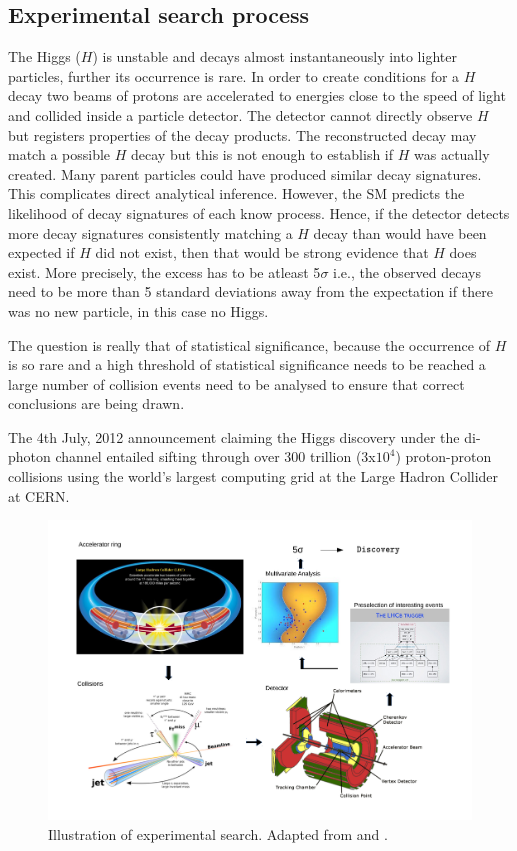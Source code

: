 \subsection{Experimental search process}
\label{esp}

The Higgs ($H$) is unstable and decays almost instantaneously into lighter particles, further its occurrence is rare. In order to create conditions for a $H$ decay two beams of protons are accelerated to energies close to the speed of light and collided inside a particle detector. The detector cannot directly observe $H$ but registers properties of the decay products. The reconstructed decay may match a possible $H$ decay but this is not enough to establish if $H$ was actually created. Many parent particles could have produced similar decay signatures. This complicates direct analytical inference. However, the SM predicts the likelihood of decay signatures of each know process. Hence, if the detector detects more decay signatures consistently matching a $H$ decay than would have been expected if $H$ did not exist, then that would be strong evidence that $H$ does exist. More precisely, the excess has to be atleast 5$\sigma$ i.e., the observed decays need to be more than 5 standard deviations away from the expectation if there was no new particle, in this case no Higgs.  

The question is really that of statistical significance, because the occurrence of $H$ is so rare and a high threshold of statistical significance needs to be reached a large number of collision events need to be analysed to ensure that correct conclusions are being drawn.  

The 4th July, 2012 announcement claiming the Higgs discovery under the di-photon channel entailed sifting through over 300 trillion ($3$x$10^{4}$) proton-proton collisions using the world's largest computing grid at the Large Hadron Collider at CERN. 


\begin{figure}
\includegraphics[width=\textwidth]{images/discovery.pdf}
\caption{Illustration of experimental search. Adapted from \cite{detector} and \cite{lhcb}.}
\end{figure}
